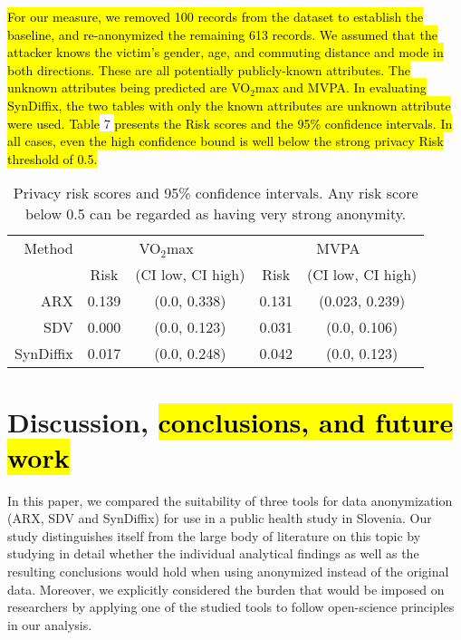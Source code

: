 \documentclass[10pt]{article}
\begin{document}
\hl{For our measure, we removed 100 records from the dataset to establish the baseline, and re-anonymized the remaining 613 records. We assumed that the attacker knows the victim's gender, age, and commuting distance and mode in both directions. These are all potentially publicly-known attributes. The unknown attributes being predicted are VO$_2$max and MVPA. In evaluating SynDiffix, the two tables with only the known attributes are unknown attribute were used. Table} 7 \hl{presents the Risk scores and the 95\% confidence intervals. In all cases, even the high confidence bound is well below the strong privacy Risk threshold of 0.5.}


\begin{table}
\begin{center}
\begin{small}
\begin{tabular}{rcccc}
\toprule
Method & \multicolumn{2}{c}{VO$_2$max} & \multicolumn{2}{c}{MVPA} \\ 
 & Risk & (CI low, CI high) & Risk & (CI low, CI high) \\ 
\midrule
ARX & 0.139 & (0.0, 0.338) & 0.131 & (0.023, 0.239) \\ 
SDV & 0.000 & (0.0, 0.123) & 0.031 & (0.0, 0.106) \\ 
SynDiffix & 0.017 & (0.0, 0.248) & 0.042 & (0.0, 0.123) \\ 
\bottomrule
\end{tabular}
\end{small}
\caption{Privacy risk scores and 95\% confidence intervals. Any risk score below 0.5 can be regarded as having very strong anonymity.}
\label{tab:risk_eval}
\end{center}
\end{table}


\section*{Discussion, \hl{conclusions, and future work}}

In this paper, we compared the suitability of three tools for data anonymization (ARX, SDV and SynDiffix) for use in a public health study in Slovenia. Our study distinguishes itself from the large body of literature on this topic by studying in detail whether the individual analytical findings as well as the resulting conclusions would hold when using anonymized instead of the original data. Moreover, we explicitly considered the burden that would be imposed on researchers by applying one of the studied tools to follow open-science principles in our analysis.
\end{document}
